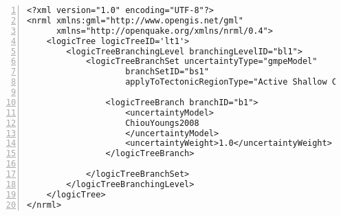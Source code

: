 \begin{Verbatim}[frame=single, commandchars=\\\{\}, fontsize=\small,
    firstnumber=1, numbers=left, numbersep=2pt]
<?xml version="1.0" encoding="UTF-8"?>
<nrml xmlns:gml="http://www.opengis.net/gml"
      xmlns="http://openquake.org/xmlns/nrml/0.4">
    <logicTree logicTreeID='lt1'>
        <logicTreeBranchingLevel branchingLevelID="bl1">
            <logicTreeBranchSet uncertaintyType="gmpeModel" 
                    branchSetID="bs1"
                    applyToTectonicRegionType="Active Shallow Crust">

                <logicTreeBranch branchID="b1">
                    <uncertaintyModel>
                    ChiouYoungs2008
                    </uncertaintyModel>
                    <uncertaintyWeight>1.0</uncertaintyWeight>
                </logicTreeBranch>

            </logicTreeBranchSet>
        </logicTreeBranchingLevel>
    </logicTree>
</nrml>
\end{Verbatim}